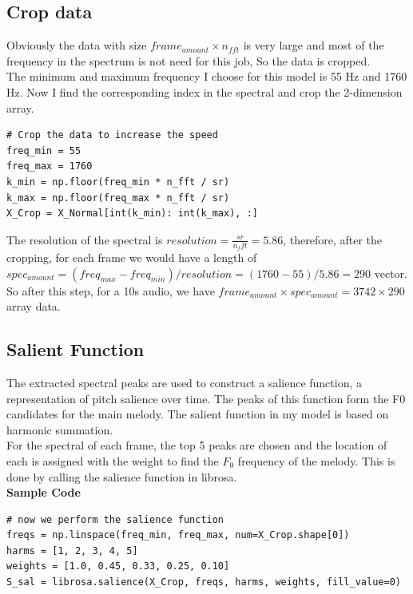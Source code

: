 \documentclass[twoside]{article}
\begin{document}
\subsection{Crop data}
Obviously the data with size $frame_{amount} \times n_{fft}$ is very large and most of the frequency in the spectrum is not need for this job, So the data is cropped.\\
The minimum and maximum frequency I choose for this model is 55 Hz and 1760 Hz. Now I find the corresponding index in the spectral and crop the 2-dimension array.\\
\begin{lstlisting}
# Crop the data to increase the speed
freq_min = 55
freq_max = 1760
k_min = np.floor(freq_min * n_fft / sr)
k_max = np.floor(freq_max * n_fft / sr)
X_Crop = X_Normal[int(k_min): int(k_max), :]
\end{lstlisting}
The resolution of the spectral is $resolution =\frac{sr}{n_fft} = 5.86 $, therefore, after the cropping, for each frame we would have  a length of $spec_{amount} = (freq_{max} - freq_{min} )/ resolution = (1760-55)/5.86=290$ vector.
So after this step, for a 10s audio, we have $frame_{amount} \times spec_{amount} = 3742\times 290$ array data.\\

\subsection{Salient Function}
The extracted spectral peaks are used to construct a salience function, a representation of pitch salience over time. The peaks of this function form the F0 candidates for the main melody. The salient function in my model is based on harmonic summation. \\
For the spectral of each frame, the top 5 peaks are chosen and the location of each is assigned with the weight to find the $F_0$ frequency of the melody. This is done by calling the salience function in librosa.\\
\textbf{Sample Code}\\
\begin{lstlisting}
# now we perform the salience function
freqs = np.linspace(freq_min, freq_max, num=X_Crop.shape[0])
harms = [1, 2, 3, 4, 5]
weights = [1.0, 0.45, 0.33, 0.25, 0.10]
S_sal = librosa.salience(X_Crop, freqs, harms, weights, fill_value=0)
\end{lstlisting}
\end{document}
